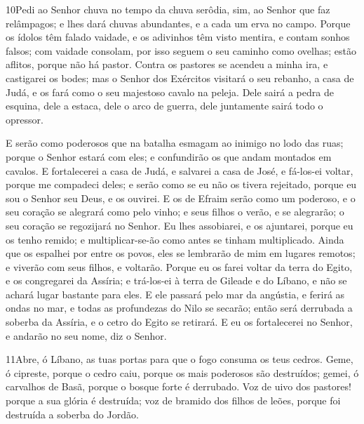 \medskip

\lettrine{10} Pedi ao Senhor chuva no tempo da chuva serôdia,
sim, ao Senhor que faz relâmpagos; e lhes dará chuvas abundantes, e
a cada um erva no campo. Porque os ídolos têm falado vaidade, e
os adivinhos têm visto mentira, e contam sonhos falsos; com vaidade
consolam, por isso seguem o seu caminho como ovelhas; estão aflitos,
porque não há pastor. Contra os pastores se acendeu a minha ira,
e castigarei os bodes; mas o Senhor dos Exércitos visitará o seu
rebanho, a casa de Judá, e os fará como o seu majestoso cavalo na
peleja. Dele sairá a pedra de esquina, dele a estaca, dele o
arco de guerra, dele juntamente sairá todo o opressor.

E serão como poderosos que na batalha esmagam ao inimigo no lodo
das ruas; porque o Senhor estará com eles; e confundirão os que
andam montados em cavalos. E fortalecerei a casa de Judá, e
salvarei a casa de José, e fá-los-ei voltar, porque me compadeci
deles; e serão como se eu não os tivera rejeitado, porque eu sou o
Senhor seu Deus, e os ouvirei. E os de Efraim serão como um
poderoso, e o seu coração se alegrará como pelo vinho; e seus filhos
o verão, e se alegrarão; o seu coração se regozijará no Senhor.
Eu lhes assobiarei, e os ajuntarei, porque eu os tenho remido; e
multiplicar-se-ão como antes se tinham multiplicado. Ainda que
os espalhei por entre os povos, eles se lembrarão de mim em lugares
remotos; e viverão com seus filhos, e voltarão. Porque eu os
farei voltar da terra do Egito, e os congregarei da Assíria; e
trá-los-ei à terra de Gileade e do Líbano, e não se achará lugar
bastante para eles. E ele passará pelo mar da angústia, e
ferirá as ondas no mar, e todas as profundezas do Nilo se secarão;
então será derrubada a soberba da Assíria, e o cetro do Egito se
retirará. E eu os fortalecerei no Senhor, e andarão no seu
nome, diz o Senhor.

\medskip

\lettrine{11} Abre, ó Líbano, as tuas portas para que o fogo
consuma os teus cedros. Geme, ó cipreste, porque o cedro caiu,
porque os mais poderosos são destruídos; gemei, ó carvalhos de Basã,
porque o bosque forte é derrubado. Voz de uivo dos pastores!
porque a sua glória é destruída; voz de bramido dos filhos de leões,
porque foi destruída a soberba do Jordão.

